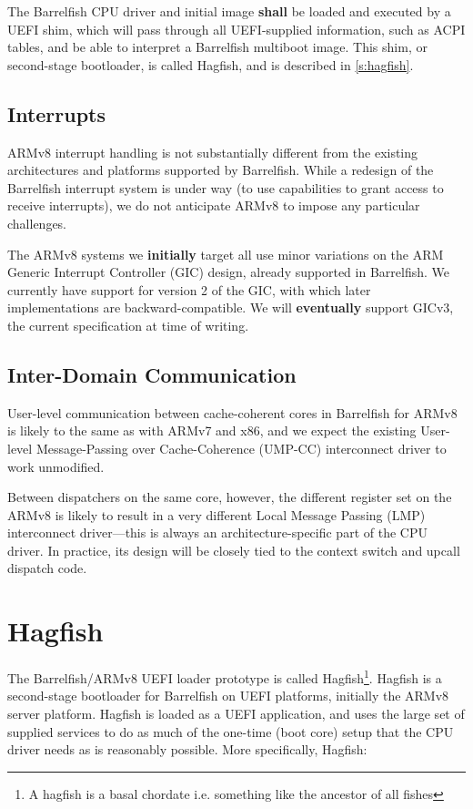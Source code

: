 \documentclass[a4paper,twoside]{report}
\begin{document}
The Barrelfish CPU driver and initial image \textbf{shall} be loaded and
executed by a UEFI shim, which will pass through all UEFI-supplied
information, such as ACPI tables, and be able to interpret a Barrelfish
multiboot image.  This shim, or second-stage bootloader, is called Hagfish,
and is described in \autoref{s:hagfish}.

\subsection{Interrupts}

ARMv8 interrupt handling is not substantially different from the existing
architectures and platforms supported by Barrelfish. While a redesign of the
Barrelfish interrupt system is under way (to use capabilities to grant access
to receive interrupts), we do not anticipate ARMv8 to impose any particular
challenges.

The ARMv8 systems we \textbf{initially} target all use minor variations on the
ARM Generic Interrupt Controller (GIC) design, already supported in
Barrelfish. We currently have support for version 2 of the GIC, with which
later implementations are backward-compatible. We will \textbf{eventually}
support GICv3, the current specification at time of writing.

\subsection{Inter-Domain Communication}

User-level communication between cache-coherent cores in Barrelfish for ARMv8
is likely to the same as with ARMv7 and x86, and we expect the existing
User-level Message-Passing over Cache-Coherence (UMP-CC) interconnect driver
to work unmodified.

Between dispatchers on the same core, however, the different register set on
the ARMv8 is likely to result in a very different Local Message Passing (LMP)
interconnect driver---this is always an architecture-specific part of the CPU
driver. In practice, its design will be closely tied to the context switch and
upcall dispatch code.

\section{Hagfish}\label{s:hagfish}

The Barrelfish/ARMv8 UEFI loader prototype is called Hagfish\footnote{A
hagfish is a basal chordate i.e. something like the ancestor of all fishes}.
Hagfish is a second-stage bootloader for Barrelfish on UEFI platforms,
initially the ARMv8 server platform.  Hagfish is loaded as a UEFI application,
and uses the large set of supplied services to do as much of the one-time
(boot core) setup that the CPU driver needs as is reasonably possible. More
specifically, Hagfish:
\end{document}
